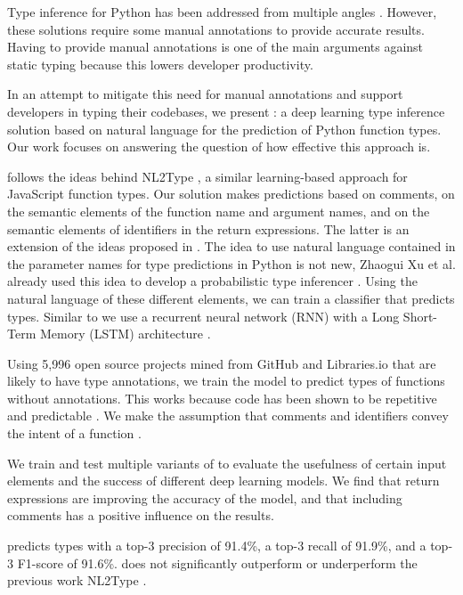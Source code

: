 Type inference for Python has been addressed from multiple angles \cite{Xu2016PythonSupport,Salib2004FasterStarkiller,MacLachlan1992TheLisp,Hassan2018MaxSMT-Based3c,Maia2012APython}. However, these solutions require some manual annotations to provide accurate results. Having to provide manual annotations is one of the main arguments against static typing because this lowers developer productivity.

In an attempt to mitigate this need for manual annotations and support developers in typing their codebases, we present \dltpy: a deep learning type inference solution based on natural language for the prediction of Python function types. Our work focuses on answering the question of how effective this approach is.

\dltpy{} follows the ideas behind NL2Type \cite{Malik2019NL2Type:Information}, a similar learning-based approach for JavaScript function types. Our solution makes predictions based on comments, on the semantic elements of the function name and argument names, and on the semantic elements of identifiers in the return expressions. The latter is an extension of the ideas proposed in \cite{Malik2019NL2Type:Information}. The idea to use natural language contained in the parameter names for type predictions in Python is not new, Zhaogui Xu et al. already used this idea to develop a probabilistic type inferencer \cite{Xu2016PythonSupport}. Using the natural language of these different elements, we can train a classifier that predicts types. Similar to \cite{Malik2019NL2Type:Information} we use a recurrent neural network (RNN) with a Long Short-Term Memory (LSTM) architecture \cite{Hochreiter1997LongMemory}.

Using 5,996 open source projects mined from GitHub and Libraries.io that are likely to have type annotations, we train the model to predict types of functions without annotations. This works because code has been shown to be repetitive and predictable \cite{Hindle2012OnSoftware}. We make the assumption that comments and identifiers convey the intent of a function \cite{Malik2019NL2Type:Information}.

We train and test multiple variants of \dltpy{} to evaluate the usefulness of certain input elements and the success of different deep learning models. We find that return expressions are improving the accuracy of the model, and that including comments has a positive influence on the results. 

\begin{notsw}
\dltpy{} predicts types with a top-3 precision of 91.4\%, a top-3 recall of 91.9\%, and a top-3 F1-score of 91.6\%. \dltpy{} does not significantly outperform or underperform the previous work NL2Type \cite{Malik2019NL2Type:Information}.
\end{notsw}

